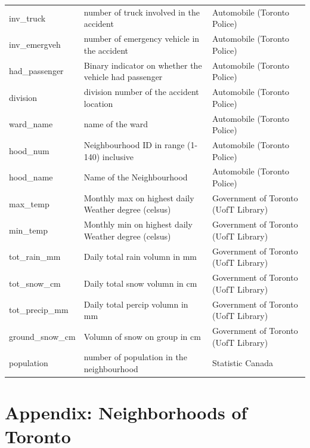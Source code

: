 \documentclass[]{article}
\begin{document}
\begin{table}[H]
\begin{tabular}{lll}
inv\_truck & number of truck involved in the accident & Automobile (Toronto Police)\\
inv\_emergveh & number of emergency vehicle in the accident & Automobile (Toronto Police)\\
had\_passenger & Binary indicator on whether the vehicle had passenger & Automobile (Toronto Police)\\
division & division number of the accident location & Automobile (Toronto Police)\\
ward\_name & name of the ward & Automobile (Toronto Police)\\
hood\_num & Neighbourhood  ID in range (1-140) inclusive & Automobile (Toronto Police)\\
hood\_name & Name of the Neighbourhood & Automobile (Toronto Police)\\
max\_temp & Monthly max on highest daily Weather degree (celsus) & Government of Toronto (UofT Library)\\
min\_temp & Monthly min on highest daily Weather degree (celsus) & Government of Toronto (UofT Library)\\
tot\_rain\_mm & Daily total rain volumn in mm & Government of Toronto (UofT Library)\\
tot\_snow\_cm & Daily total snow volumn in cm & Government of Toronto (UofT Library)\\
tot\_precip\_mm & Daily total percip volumn in mm & Government of Toronto (UofT Library)\\
ground\_snow\_cm & Volumn of snow on group in cm & Government of Toronto (UofT Library)\\
population & number of population in the neighbourhood & Statistic Canada\\
\bottomrule
\end{tabular}
\end{table}

\pagebreak

\newpage

\section{Appendix: Neighborhoods of
Toronto}\label{appendix-neighborhoods-of-toronto}
\end{document}

